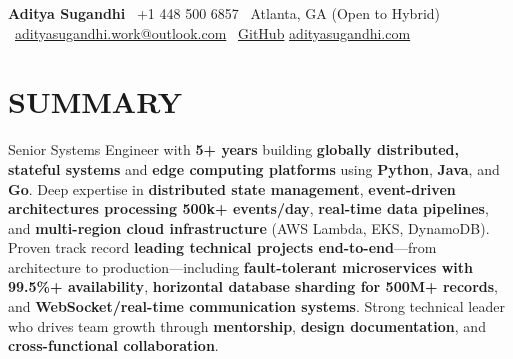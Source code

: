 \documentclass[letterpaper,10pt]{article}
\begin{document}
\begin{center}
{\huge\textbf{Aditya Sugandhi}} \
+1 448 500 6857 \textbar\ \textcolor{metablue}{Atlanta, GA (Open to Hybrid)} \textbar\
\href{mailto:adityasugandhi.work@outlook.com}{adityasugandhi.work@outlook.com} \textbar\
\href{https://github.com/adityasugandhi}{GitHub}
\textbar \href{https://adityasugandhi.com}{adityasugandhi.com}
\end{center}
\vspace{-12pt}

\section{\textcolor{metablue}{SUMMARY}}
\small
\vspace{-6pt}
Senior Systems Engineer with \textbf{5+ years} building \textbf{globally distributed, stateful systems} and \textbf{edge computing platforms} using \textbf{Python}, \textbf{Java}, and \textbf{Go}. Deep expertise in \textbf{distributed state management}, \textbf{event-driven architectures processing 500k+ events/day}, \textbf{real-time data pipelines}, and \textbf{multi-region cloud infrastructure} (AWS Lambda, EKS, DynamoDB). Proven track record \textbf{leading technical projects end-to-end}—from architecture to production—including \textbf{fault-tolerant microservices with 99.5\%+ availability}, \textbf{horizontal database sharding for 500M+ records}, and \textbf{WebSocket/real-time communication systems}. Strong technical leader who drives team growth through \textbf{mentorship}, \textbf{design documentation}, and \textbf{cross-functional collaboration}.

\vspace{-9pt}

\end{document}
